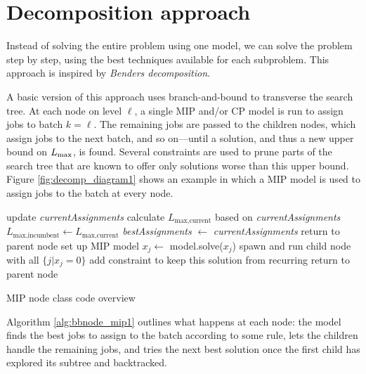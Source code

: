 \documentclass[13pt, letterpaper, oneside]{book}
\begin{document}
\section{Decomposition approach}

Instead of solving the entire problem using one model, we can solve the problem
step by step, using the best techniques available for each subproblem. This
approach is inspired by \textit{Benders decomposition}.

\label{sec:mipdecomp}
A basic version of this approach uses branch-and-bound to transverse the search
tree. At each node on level $\ell$, a single MIP and/or CP model is run to
assign jobs to batch $k = \ell$. The remaining jobs are passed to the children
nodes, which assign jobs to the next batch, and so on---until a solution, and
thus a new upper bound on $L_{\text{max}}$, is found. Several constraints are used to
prune parts of the search tree that are known to offer only solutions worse than
this upper bound. Figure \ref{fig:decomp_diagram1} shows an example in which a
MIP model is used to assign jobs to the batch at every node.
\begin{algorithm}[h]
\fontsize{9pt}{11.5pt}\selectfont
\begin{algorithmic}
\State update \textit{currentAssignments} 
 
  \State calculate $L_{\text{max,current}}$ based on \textit{currentAssignments}
    \State $L_{\text{max,incumbent}} \gets L_{\text{max,current}}$
    \State \textit{bestAssignments} $\gets$ \textit{currentAssignments}
  \EndIf
  \State return to parent node
\EndIf
\State set up MIP model 
\Repeat
  \State $x_j \gets$ model.solve($x_j$) 
  \State spawn and run child node with all $\{j | x_j = 0\}$ 
  \State add constraint to keep this solution from recurring 
\State return to parent node
\end{algorithmic}
\caption{MIP node class code overview}
\label{alg:bbnode_mip1}
\end{algorithm}
Algorithm \ref{alg:bbnode_mip1} outlines what happens at each node: the model
finds the best jobs to assign to the batch according to some rule, lets the
children handle the remaining jobs, and tries the next best solution once the
first child has explored its subtree and backtracked.
\end{document}

